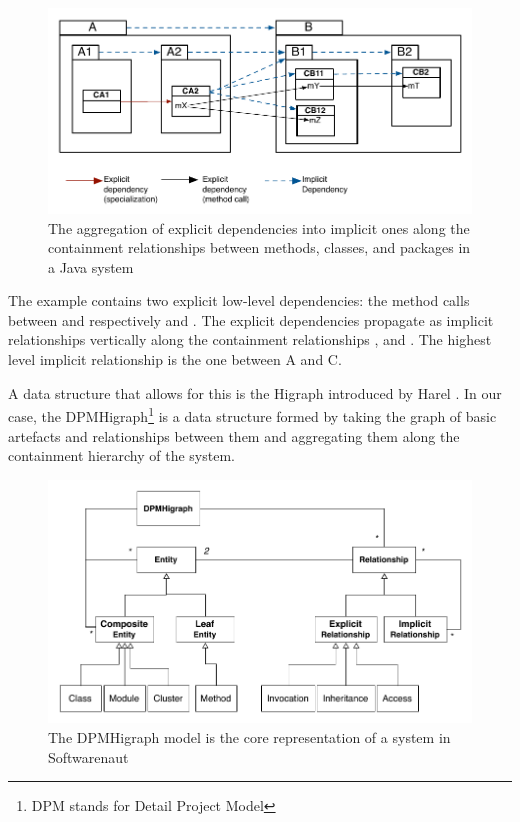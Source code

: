 \documentclass[preprint,12pt]{elsarticle}
\begin{document}
\begin{figure}[ht]
\begin{center}
\includegraphics[width=\linewidth]{DependencyAggregation}
\caption{The aggregation of explicit dependencies into implicit ones along the containment relationships between methods, classes, and packages in a Java system}
\end{center}
\end{figure}

The example contains two explicit low-level dependencies: the method calls between  and respectively  and . The explicit dependencies propagate as implicit relationships vertically along the containment relationships ,  and . The highest level implicit relationship is the one between A and C. 

A data structure that allows for this is the Higraph introduced by Harel \cite{harel-visform}. In our case, the DPMHigraph\footnote{DPM stands for Detail Project Model} is a data structure formed by taking the graph of basic artefacts and relationships between them and aggregating them along the containment hierarchy of the system. 

\begin{figure}[h]
\begin{center}
\includegraphics[width=0.9\linewidth]{HigraphModel}
\caption{The DPMHigraph model is the core representation of a system in Softwarenaut}
\end{center}
\end{figure}
\end{document}
